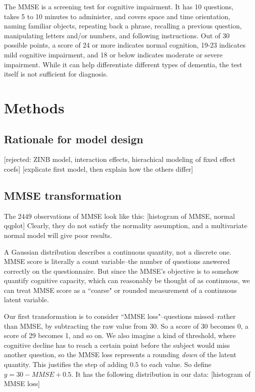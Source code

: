 \documentclass[12pt]{article}
\begin{document}
The MMSE is a screening test for cognitive impairment. It has 10 questions, takes 5 to 10 minutes to administer, and covers space and time orientation, naming familiar objects, repeating back a phrase, recalling a previous question, manipulating letters and/or numbers, and following instructions. Out of 30 possible points, a score of 24 or more indicates normal cognition, 19-23 indicates mild cognitive impairment, and 18 or below indicates moderate or severe impairment. While it can help differentiate different types of dementia, the test itself is not sufficient for diagnosis.

\section{Methods}

\subsection{Rationale for model design}

[rejected: ZINB model, interaction effects, hierachical modeling of fixed effect coefs]
[explicate first model, then explain how the others differ]

\subsection{MMSE transformation}

The 2449 observations of MMSE look like this:
{\color{teal}[histogram of MMSE, normal qqplot]}
Clearly, they do not satisfy the normality assumption, and a multivariate normal model will give poor results.

A Gaussian distribution describes a continuous quantity, not a discrete one. MMSE score is literally a count variable--the number of questions answered correctly on the questionnaire. But since the MMSE's objective is to somehow quantify cognitive capacity, which can reasonably be thought of as continuous, we can treat MMSE score as a ``coarse" or rounded measurement of a continuous latent variable. 

Our first transformation is to consider ``MMSE loss"--questions missed--rather than MMSE, by subtracting the raw value from 30. So a score of 30 becomes 0, a score of 29 becomes 1, and so on. We also imagine a kind of threshold, where cognitive decline has to reach a certain point before the subject would miss another question, so the MMSE loss represents a rounding \textit{down} of the latent quantity. This justifies the step of adding $0.5$ to each value. So define $y = 30 - MMSE + 0.5$. It has the following distribution in our data: {\color{teal}[histogram of MMSE loss]}
\end{document}
